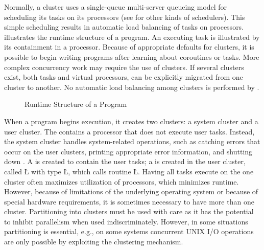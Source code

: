 \documentclass[openright,twoside]{report}
\begin{document}
Normally, a cluster uses a single-queue multi-server queueing model for scheduling its tasks on its processors (see  for other kinds of schedulers).
This simple scheduling results in automatic load balancing of tasks on processors.
 illustrates the runtime structure of a \uC program.
An executing task is illustrated by its containment in a processor.
Because of appropriate defaults for clusters, it is possible to begin writing \uC programs after learning about coroutines or tasks.
More complex concurrency work may require the use of clusters.
If several clusters exist, both tasks and virtual processors, can be explicitly migrated from one cluster to another.
No automatic load balancing among clusters is performed by \uC.

\begin{figure}[htb]
\centering

\vspace{-3mm}
\caption{Runtime Structure of a \uC Program}
\label{f:RunTimeStructure}
\end{figure}

When a \uC program begins execution, it creates two clusters: a system cluster and a user cluster.
The  contains a processor that does not execute user tasks.
Instead, the system cluster handles system-related operations, such as catching errors that occur on the user clusters, printing appropriate error information, and shutting down \uC.
A  is created to contain the user tasks;
a  is created in the user cluster, called \LGinlinetrue\LGbegin\lgrinde\L{}\endlgrinde\LGend{} with type \LGinlinetrue\LGbegin\lgrinde\L{}\endlgrinde\LGend{}, which calls routine \LGinlinetrue\LGbegin\lgrinde\L{}\endlgrinde\LGend{}.
Having all tasks execute on the one cluster often maximizes utilization of processors, which minimizes runtime.
However, because of limitations of the underlying operating system or because of special hardware requirements, it is sometimes necessary to have more than one cluster.
Partitioning into clusters must be used with care as it has the potential to inhibit parallelism when used indiscriminately.
However, in some situations partitioning is essential, e.g., on some systems concurrent UNIX I/O operations are only possible by exploiting the clustering mechanism.
\end{document}
